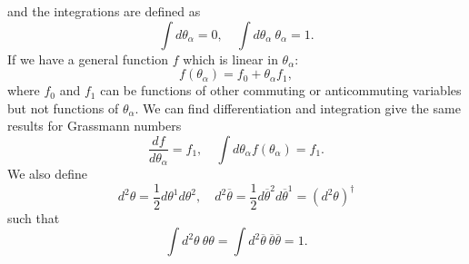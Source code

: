 \documentclass[12pt]{report}
\begin{document}
and the integrations are defined as
\begin{equation}
\int d\theta_{\alpha} = 0, \quad 
\int d\theta_{\alpha} \ \theta_{\alpha}  = 1 .
\end{equation}
If we have a general function $f$ which is linear in $\theta_{\alpha}$:
\begin{equation}
f(\theta_{\alpha}) = f_{0} + \theta_{\alpha} f_{1} ,
\end{equation}
where $f_{0}$ and $f_{1}$ can be functions of other commuting or anticommuting variables but not functions of $\theta_{\alpha}$.
We can find differentiation and integration give the same results for Grassmann numbers
\begin{equation}
\frac{df}{d\theta_{\alpha}} = f_{1}, \quad \int d\theta_{\alpha} f(\theta_{\alpha}) = f_{1} .
\end{equation}
We also define
\begin{equation}
d^{2} \theta = \frac{1}{2} d\theta^{1} d\theta^{2}, \quad  
d^{2}\overline{\theta} = \frac{1}{2} d\overline{\theta}^{2} d\overline{\theta}^{1} = (d^{2} \theta)^{\dag}
\end{equation}
such that
\begin{equation}
\int d^{2} \theta \ \theta \theta = \int d^{2} \overline{\theta} \ \overline{\theta} \overline{\theta} = 1 .
\end{equation}
\end{document}
